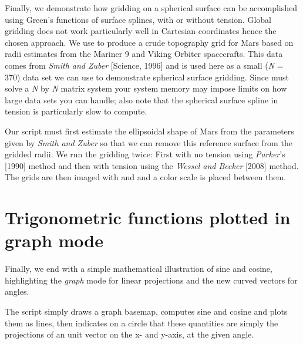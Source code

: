 Finally, we demonstrate how gridding on a spherical surface can be accomplished using Green's functions
of surface splines, with or without tension.  Global gridding does not work particularly well in
Cartesian coordinates hence the chosen approach.  We use  to produce a crude
topography grid for Mars based on radii estimates from the Mariner 9 and Viking Orbiter spacecrafts.
This data comes from \emph{Smith and Zuber} [Science, 1996] and is used here as a small (\emph{N} = 370) data set we
can use to demonstrate spherical surface gridding.  Since  must solve a \emph{N} by \emph{N}
matrix system your system memory may impose limits on how large data sets you can handle; also note that
the spherical surface spline in tension is particularly slow to compute.


Our script must first estimate the ellipsoidal shape of Mars from the parameters given by \emph{Smith and Zuber}
so that we can remove this reference surface from the gridded radii.  We run the gridding twice: First with
no tension using \emph{Parker}'s [1990] method and then with tension using the \emph{Wessel and Becker} [2008] method.
The grids are then imaged with  and  and a color scale is placed between
them.

 

\section{Trigonometric functions plotted in graph mode}

Finally, we end with a simple mathematical illustration of sine and cosine, highlighting the
\emph{graph} mode for linear projections and the new curved vectors for angles.


The script simply draws a graph basemap, computes sine and cosine and plots them as lines, then
indicates on a circle that these quantities are simply the projections of an unit vector on the
x- and y-axis, at the given angle.

 
